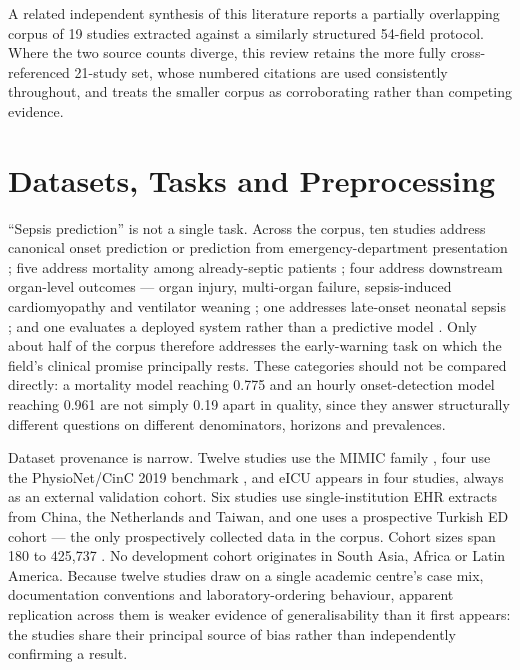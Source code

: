 \documentclass[conference]{IEEEtran}
\begin{document}
A related independent synthesis of this literature reports a partially overlapping corpus of 19 studies extracted against a similarly structured 54-field protocol. Where the two source counts diverge, this review retains the more fully cross-referenced 21-study set, whose numbered citations are used consistently throughout, and treats the smaller corpus as corroborating rather than competing evidence.

\section{Datasets, Tasks and Preprocessing}

``Sepsis prediction'' is not a single task. Across the corpus, ten studies address canonical onset prediction or prediction from emergency-department presentation \cite{r13,r14,r15,r18,r22,r27,r29,r30,r31,r33}; five address mortality among already-septic patients \cite{r17,r19,r20,r23,r24}; four address downstream organ-level outcomes --- organ injury, multi-organ failure, sepsis-induced cardiomyopathy and ventilator weaning \cite{r16,r21,r25,r26}; one addresses late-onset neonatal sepsis \cite{r32}; and one evaluates a deployed system rather than a predictive model \cite{r28}. Only about half of the corpus therefore addresses the early-warning task on which the field's clinical promise principally rests. These categories should not be compared directly: a mortality model reaching 0.775 and an hourly onset-detection model reaching 0.961 are not simply 0.19 apart in quality, since they answer structurally different questions on different denominators, horizons and prevalences.

Dataset provenance is narrow. Twelve studies use the MIMIC family \cite{r4,r5}, four use the PhysioNet/CinC 2019 benchmark \cite{r7}, and eICU \cite{r6} appears in four studies, always as an external validation cohort. Six studies use single-institution EHR extracts from China, the Netherlands and Taiwan, and one uses a prospective Turkish ED cohort \cite{r24} --- the only prospectively collected data in the corpus. Cohort sizes span 180 \cite{r24} to 425,737 \cite{r27}. No development cohort originates in South Asia, Africa or Latin America. Because twelve studies draw on a single academic centre's case mix, documentation conventions and laboratory-ordering behaviour, apparent replication across them is weaker evidence of generalisability than it first appears: the studies share their principal source of bias rather than independently confirming a result.
\end{document}
